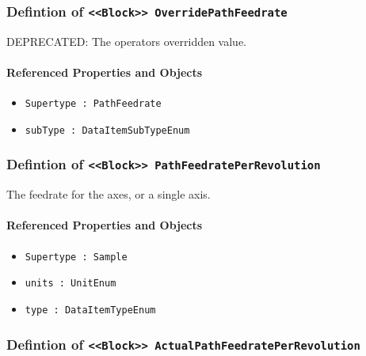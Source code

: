 \subsubsection{Defintion of \texttt{<<Block>> OverridePathFeedrate}}
  \label{type:OverridePathFeedrate}

\FloatBarrier

DEPRECATED: The operators overridden value.

\FloatBarrier
\paragraph{Referenced Properties and Objects}

\begin{itemize}
\item \texttt{Supertype : PathFeedrate}

\item \texttt{subType : DataItemSubTypeEnum}

\end{itemize}
\FloatBarrier
\subsubsection{Defintion of \texttt{<<Block>> PathFeedratePerRevolution}}
  \label{type:PathFeedratePerRevolution}

\FloatBarrier

The feedrate for the axes, or a single axis.

\FloatBarrier
\paragraph{Referenced Properties and Objects}

\begin{itemize}
\item \texttt{Supertype : Sample}

\item \texttt{units : UnitEnum}

\item \texttt{type : DataItemTypeEnum}

\end{itemize}
\FloatBarrier
\subsubsection{Defintion of \texttt{<<Block>> ActualPathFeedratePerRevolution}}
  \label{type:ActualPathFeedratePerRevolution}

\FloatBarrier


